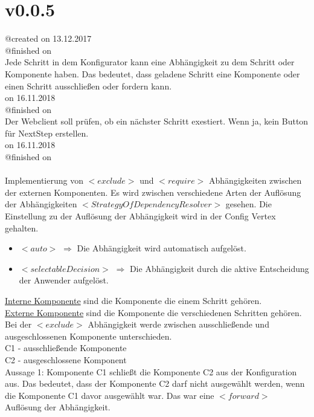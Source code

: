 \documentclass{article}
\begin{document}
\section{v0.0.5}

@created on 13.12.2017\\
@finished on \\
Jede Schritt in dem Konfigurator kann eine Abhängigkeit zu dem Schritt oder
Komponente haben. Das bedeutet, dass geladene Schritt eine Komponente oder einen
Schritt ausschlie\ss{}en oder fordern kann.\\

\noindent@created on 16.11.2018\\
@finished on \\
Der Webclient soll prüfen, ob ein nächster Schritt exestiert. Wenn ja, kein Button für NextStep erstellen.\\

\noindent@created on 16.11.2018\\
@finished on \\
\\
Implementierung von $<exclude>$ und $<require>$ Abhängigkeiten zwischen der externen Komponenten.
Es wird zwischen verschiedene Arten der Auflösung der Abhängigkeiten $<StrategyOfDependencyResolver>$ gesehen.
Die Einstellung zu der Auflösung der Abhängigkeit wird in der Config Vertex gehalten.

\begin{itemize}
    \item $<auto>$ $\Rightarrow$ Die Abhängigkeit wird automatisch aufgelöst.
    \item $<selectableDecision>$ $\Rightarrow$ Die Abhängigkeit durch 
    die aktive Entscheidung der Anwender aufgelöst. 
\end{itemize}

\noindent\underline{Interne Komponente} sind die Komponente die einem Schritt gehören.\\
\underline{Externe Komponente} sind die Komponente die verschiedenen Schritten gehören.\\

\noindent Bei der $<exclude>$ Abhängigkeit werde zwischen ausschließende und ausgeschlossenen 
Komponente unterschieden.\\
C1 - ausschließende Komponente\\
C2 - ausgeschlossene Komponent\\

Aussage 1: Komponente C1 schließt die Komponente C2 aus der Konfiguration aus. Das bedeutet, dass
der Komponente C2 darf nicht ausgewählt werden, wenn die Komponente C1 davor ausgewählt war. Das war 
eine $<forward>$ Auflösung der Abhängigkeit.\\
\end{document}

